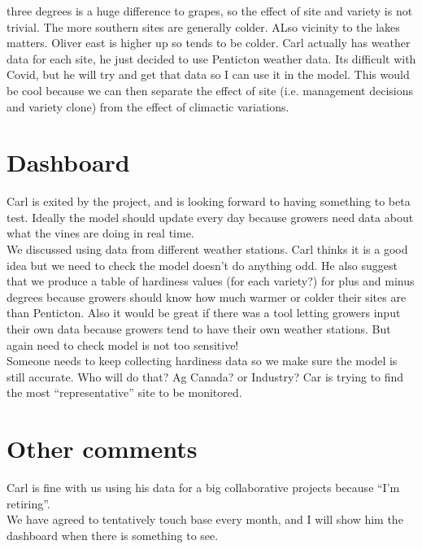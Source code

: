 \documentclass[11pt,letter]{article}
\begin{document}
three degrees is a huge difference to grapes, so the effect of site and variety is not trivial. The more southern sites are generally colder. ALso vicinity to the lakes matters. Oliver east is higher up so tends to be colder. Carl actually has weather data for each site, he just decided to use Penticton weather data. Its difficult with Covid, but he will try and get that data so I can use it in the model. This would be cool because we can then separate the effect of site (i.e. management decisions and variety clone) from the effect of climactic variations. \\


\section{Dashboard}

Carl is exited by the project, and is looking forward to having something to beta test. Ideally the model should update every day because growers need data about what the vines are doing in real time. \\

We discussed using data from different weather stations. Carl thinks it is a good idea but we need to check the model doesn't do anything odd. He also suggest that we produce a table of hardiness values (for each variety?) for plus and minus degrees because growers should know how much warmer or colder their sites are than Penticton. Also it would be great if there was a tool letting growers input their own data because growers tend to have their own weather stations. But again need to check model is not too sensitive! \\

Someone needs to keep collecting hardiness data so we make sure the model is still accurate. Who will do that? Ag Canada? or Industry? Car is trying to find the most ``representative'' site to be monitored. \\

\section{Other comments}
Carl is fine with us using his data for a big collaborative projects because ``I'm retiring''. \\

We have agreed to tentatively touch base every month, and I will show him the dashboard when there is something to see. 
\end{document}
